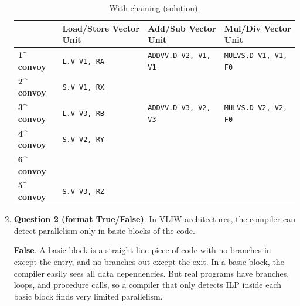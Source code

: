 \begin{enumerate}
    \begin{table}[!htp]
        \centering
        \begin{adjustbox}{width={\textwidth},totalheight={\textheight},keepaspectratio}
            \begin{tabular}{@{} l | l | l | l @{}}
                \toprule
                & \textbf{Load/Store Vector Unit}    & \textbf{Add/Sub Vector Unit}   & \textbf{Mul/Div Vector Unit}   \\
                \midrule
                \textbf{1\textasciicircum \, convoy}    & \texttt{L.V V1, RA}       & \texttt{ADDVV.D V2, V1, V1}   & \texttt{MULVS.D V1, V1, F0}   \\ [.3em]
                \textbf{2\textasciicircum \, convoy}    & \texttt{S.V V1, RX}       &                               &                               \\ [.3em]
                \textbf{3\textasciicircum \, convoy}    & \texttt{L.V V3, RB}       & \texttt{ADDVV.D V3, V2, V3}   & \texttt{MULVS.D V2, V2, F0}   \\ [.3em]
                \textbf{4\textasciicircum \, convoy}    & \texttt{S.V V2, RY}       &                               &                               \\ [.3em]
 [.3em]
                \textbf{6\textasciicircum \, convoy}    &                           &                               &                               \\                \textbf{5\textasciicircum \, convoy}    & \texttt{S.V V3, RZ}       &                               &                               \\
                \bottomrule
            \end{tabular}
        \end{adjustbox}
        \caption*{With chaining (solution).}
    \end{table}


    \item \textbf{Question 2 (format True/False)}. In VLIW architectures, the compiler can detect parallelism only in basic blocks of the code.
    
    \answer \textbf{False}. A basic block is a straight-line piece of code with no branches in except the entry, and no branches out except the exit. In a basic block, the compiler easily sees all data dependencies. But real programs have branches, loops, and procedure calls, so a compiler that only detects ILP inside each basic block finds very limited parallelism.


\end{enumerate}
